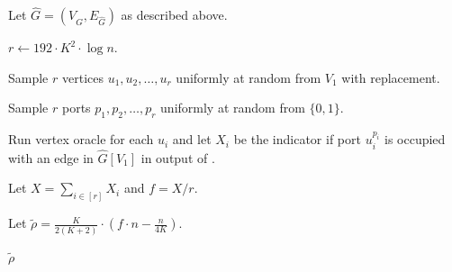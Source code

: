 \begin{algorithm}
\caption{Final algorithm for maximum path cover.}
\label{alg: disjoint-paths}
    Let $\hat{G} = (V_{\hat{G}}, E_{\hat{G}})$ as described above.

    $r \gets 192\cdot K^2 \cdot \log n$.
    
    Sample $r$ vertices $u_1, u_2, \ldots, u_r$ uniformly at random from $V_1$ with replacement.
    
    Sample $r$ ports $p_1, p_2, \ldots, p_r$ uniformly at random from $\{0, 1\}$.
    
    Run vertex oracle for each $u_i$ and let $X_i$ be the indicator if port $u_i^{p_i}$ is occupied with an edge in $\hat{G}[V_1]$ in output of \algtwo{}.
    

Let $X = \sum_{i \in [r]} X_i$ and $f = X/r$.

Let $\tilde{\rho} = \frac{K}{2(K + 2)}\cdot (f \cdot n - \frac{n}{4K})$.
    
\Return $\tilde{\rho}$
\end{algorithm}



